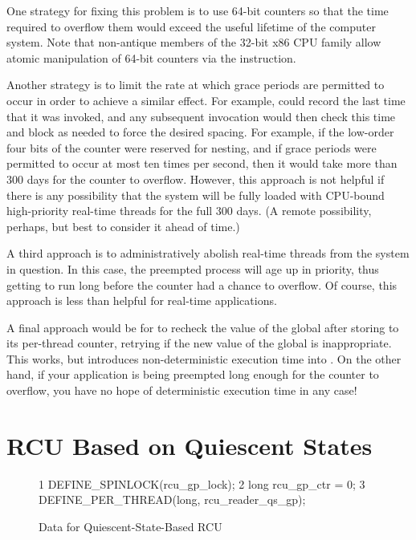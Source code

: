 {	One strategy for fixing this problem is to use 64-bit
	counters so that the time required to overflow them would exceed
	the useful lifetime of the computer system.
	Note that non-antique members of the 32-bit x86 CPU family
	allow atomic manipulation of 64-bit counters via the
	 instruction.

	Another strategy is to limit the rate at which grace periods are
	permitted to occur in order to achieve a similar effect.
	For example,  could record the last time
	that it was invoked, and any subsequent invocation would then
	check this time and block as needed to force the desired
	spacing.
	For example, if the low-order four bits of the counter were
	reserved for nesting, and if grace periods were permitted to
	occur at most ten times per second, then it would take more
	than 300 days for the counter to overflow.
	However, this approach is not helpful if there is any possibility
	that the system will be fully loaded with CPU-bound high-priority
	real-time threads for the full 300 days.
	(A remote possibility, perhaps, but best to consider it ahead
	of time.)

	A third approach is to administratively abolish real-time threads
	from the system in question.
	In this case, the preempted process will age up in priority,
	thus getting to run long before the counter had a chance to
	overflow.
	Of course, this approach is less than helpful for real-time
	applications.

	A final approach would be for  to recheck
	the value of the global  after storing to its
	per-thread  counter, retrying if the new
	value of the global  is inappropriate.
	This works, but introduces non-deterministic execution time
	into .
	On the other hand, if your application is being preempted long
	enough for the counter to overflow, you have no hope of
	deterministic execution time in any case!
} \QuickQuizEnd

\section{RCU Based on Quiescent States}
\label{sec:app:toyrcu:RCU Based on Quiescent States}

\begin{figure}[tbp]
{ \scriptsize
\begin{verbbox}
  1 DEFINE_SPINLOCK(rcu_gp_lock);
  2 long rcu_gp_ctr = 0;
  3 DEFINE_PER_THREAD(long, rcu_reader_qs_gp);
\end{verbbox}
}
\centering
\theverbbox
\caption{Data for Quiescent-State-Based RCU}
\label{fig:app:toyrcu:Data for Quiescent-State-Based RCU}
\end{figure}

